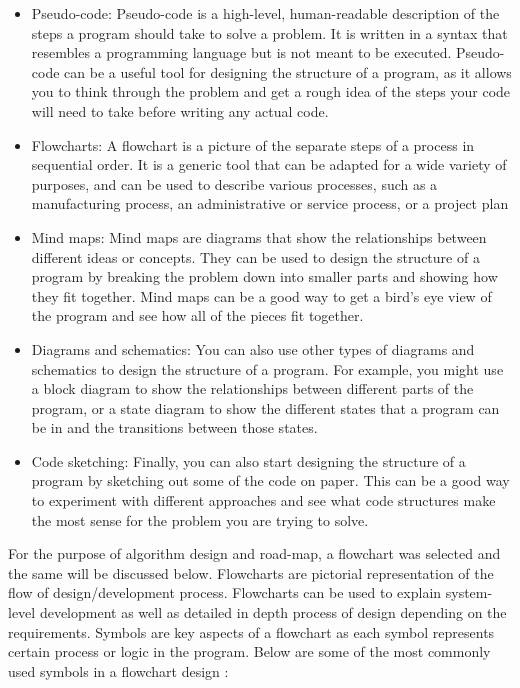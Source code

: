 \begin{itemize}
    \item Pseudo-code: Pseudo-code is a high-level, human-readable description of the steps a program should take to solve a problem. It is written in a syntax that resembles a programming language but is not meant to be executed. Pseudo-code can be a useful tool for designing the structure of a program, as it allows you to think through the problem and get a rough idea of the steps your code will need to take before writing any actual code.
    \item Flowcharts: A flowchart is a picture of the separate steps of a process in sequential order. It is a generic tool that can be adapted for a wide variety of purposes, and can be used to describe various processes, such as a manufacturing process, an administrative or service process, or a project plan \cite{Flow}
    \item Mind maps: Mind maps are diagrams that show the relationships between different ideas or concepts. They can be used to design the structure of a program by breaking the problem down into smaller parts and showing how they fit together. Mind maps can be a good way to get a bird's eye view of the program and see how all of the pieces fit together.
    \item Diagrams and schematics: You can also use other types of diagrams and schematics to design the structure of a program. For example, you might use a block diagram to show the relationships between different parts of the program, or a state diagram to show the different states that a program can be in and the transitions between those states.
    \item Code sketching: Finally, you can also start designing the structure of a program by sketching out some of the code on paper. This can be a good way to experiment with different approaches and see what code structures make the most sense for the problem you are trying to solve.
\end{itemize}

For the purpose of algorithm design and road-map, a flowchart was selected and the same will be discussed below. Flowcharts are pictorial representation of the flow of design/development process. Flowcharts can be used to explain system-level development as well as detailed in depth process of design depending on the requirements. Symbols are key aspects of a flowchart as each symbol represents certain process or logic in the program. Below are some of the most commonly used symbols in a flowchart design : 


